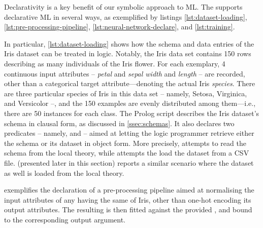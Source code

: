 \documentclass[12pt,a4paper,openright,twoside]{book}
\begin{document}
\begin{figure}
\end{figure}

Declarativity is a key benefit of our symbolic approach to ML.
%
The \mllib{} supports declarative ML in several ways, as exemplified by listings \ref{lst:dataset-loading}, \ref{lst:pre-processing-pipeline}, \ref{lst:neural-network-declare}, and \ref{lst:training}.

In particular, \cref{lst:dataset-loading} shows how the schema and data entries of the Iris dataset can be treated in logic.
%
Notably, the Iris data set contains 150 rows describing as many individuals of the Iris flower.
%
For each exemplary, 4 continuous input attributes -- \emph{petal} and \emph{sepal width} and \emph{length} -- are recorded, other than a categorical target attribute---denoting the actual Iris \emph{species}.
%
There are three particular species of Iris in this data set -- namely, Setosa, Virginica, and Versicolor --, and the 150 examples are evenly distributed among them---i.e., there are 50 instances for each class.
%
The Prolog script describes the Iris dataset's schema in clausal form, as discussed in \cref{ssec:schemas}.
%
It also declares two predicates -- namely,  and  -- aimed at letting the logic programmer retrieve either the schema or its dataset in object form.
%
More precisely,  attempts to read the schema from the local theory, while  attempts the load the dataset from a CSV file.
%
 (presented later in this section) reports a similar scenario where the dataset as well is loaded from the local theory.

 exemplifies the declaration of a pre-processing pipeline aimed at normalising the input attributes of any  having the same  of Iris, other than one-hot encoding its output attributes.
%
The resulting  is then fitted against the provided , and bound to the corresponding output argument.
\end{document}

